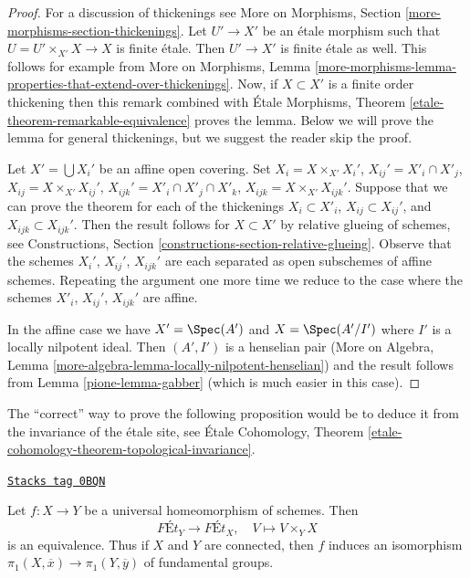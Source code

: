 \begin{proof}

For a discussion of thickenings see
More on Morphisms, Section \ref{more-morphisms-section-thickenings}.
Let $U' \to X'$ be an \'etale morphism such that $U = U' \times_{X'} X \to X$
is finite \'etale. Then $U' \to X'$ is finite \'etale as well.
This follows for example from More on Morphisms, Lemma
\ref{more-morphisms-lemma-properties-that-extend-over-thickenings}.
Now, if $X \subset X'$ is a finite order thickening then this remark
combined with \'Etale Morphisms, Theorem
\ref{etale-theorem-remarkable-equivalence}
proves the lemma. Below we will prove the lemma for general thickenings, but
we suggest the reader skip the proof.

\medskip\noindent
Let $X' = \bigcup X_i'$ be an affine open covering. Set
$X_i = X \times_{X'} X_i'$, $X_{ij}' = X'_i \cap X'_j$,
$X_{ij} = X \times_{X'} X_{ij}'$, $X_{ijk}' = X'_i \cap X'_j \cap X'_k$,
$X_{ijk} = X \times_{X'} X_{ijk}'$.
Suppose that we can prove
the theorem for each of the thickenings
$X_i \subset X'_i$, $X_{ij} \subset X_{ij}'$, and $X_{ijk} \subset X_{ijk}'$.
Then the result follows for $X \subset X'$ by relative glueing of
schemes, see
Constructions, Section \ref{constructions-section-relative-glueing}.
Observe that the schemes $X_i'$, $X_{ij}'$, $X_{ijk}'$ are
each separated as open subschemes of affine schemes. Repeating the
argument one more time we reduce to the case where the schemes
$X'_i$, $X_{ij}'$, $X_{ijk}'$ are affine.

\medskip\noindent
In the affine case we have $X' = \Spec(A')$ and $X = \Spec(A'/I')$
where $I'$ is a locally nilpotent ideal. Then $(A', I')$ is a
henselian pair (More on Algebra, Lemma
\ref{more-algebra-lemma-locally-nilpotent-henselian})
and the result follows from Lemma \ref{pione-lemma-gabber} (which is
much easier in this case).
\end{proof}

The ``correct'' way to prove the following proposition would be to
deduce it from the invariance of the \'etale site, see
\'Etale Cohomology, Theorem
\ref{etale-cohomology-theorem-topological-invariance}.

\begin{proposition}
\label{pione-proposition-universal-homeomorphism}
\href{https://stacks.math.columbia.edu/tag/0BQN}{\texttt{Stacks tag 0BQN}}

Let $f : X \to Y$ be a universal homeomorphism of schemes. Then
$$
\textit{F\'Et}_Y \longrightarrow \textit{F\'Et}_X,\quad
V \longmapsto V \times_Y X
$$
is an equivalence. Thus if $X$ and $Y$ are connected, then
$f$ induces an isomorphism $\pi_1(X, \overline{x}) \to \pi_1(Y, \overline{y})$
of fundamental groups.
\end{proposition}

